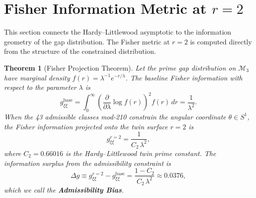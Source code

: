 \documentclass[12pt]{article}
\newtheorem{theorem}{Theorem}[section]
\begin{document}
\section{Fisher Information Metric at $r=2$}

This section connects the Hardy--Littlewood asymptotic to the information
geometry of the gap distribution. The Fisher metric at $r=2$ is computed directly
from the structure of the constrained distribution.

\begin{theorem}[Fisher Projection Theorem]
Let the prime gap distribution on $\mathcal{M}_3$ have marginal density
$f(r) = \lambda^{-1} e^{-r/\lambda}$. The baseline Fisher information
with respect to the parameter $\lambda$ is
\begin{equation}
  g_{\xi\xi}^{\text{base}}
  = \int_0^\infty \left(\frac{\partial}{\partial\lambda}
    \log f(r)\right)^2 f(r)\,dr = \frac{1}{\lambda^2}.
  \label{eq:fisher_base}
\end{equation}
When the 43 admissible classes mod-210 constrain the angular coordinate
$\theta \in S^1$, the Fisher information projected onto the twin surface
$r=2$ is
\begin{equation}
  g_{\xi\xi}^{r=2} = \frac{1}{C_2\,\lambda^2},
  \label{eq:fisher_r2}
\end{equation}
where $C_2 = 0.66016$ is the Hardy--Littlewood twin prime constant.
The information surplus from the admissibility constraint is
\[
  \Delta g \equiv g_{\xi\xi}^{r=2} - g_{\xi\xi}^{\text{base}}
  = \frac{1 - C_2}{C_2\,\lambda^2} \approx 0.0376,
\]
which we call the \textbf{Admissibility Bias}.
\label{thm:fisher}
\end{theorem}
\end{document}
